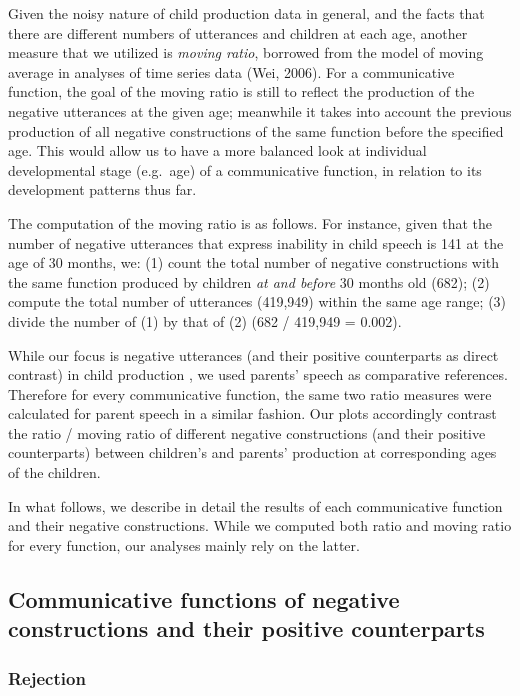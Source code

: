 \documentclass[
  english,
  man,floatsintext]{apa6}
\begin{document}
Given the noisy nature of child production data in general, and the facts that there are different numbers of utterances and children at each age, another measure that we utilized is \emph{moving ratio}, borrowed from the model of moving average in analyses of time series data (Wei, 2006). For a communicative function, the goal of the moving ratio is still to reflect the production of the negative utterances at the given age; meanwhile it takes into account the previous production of all negative constructions of the same function before the specified age. This would allow us to have a more balanced look at individual developmental stage (e.g.~age) of a communicative function, in relation to its development patterns thus far.

The computation of the moving ratio is as follows. For instance, given that the number of negative utterances that express inability in child speech is 141 at the age of 30 months, we: (1) count the total number of negative constructions with the same function produced by children \emph{at and before} 30 months old (682); (2) compute the total number of utterances (419,949) within the same age range; (3) divide the number of (1) by that of (2) (682 / 419,949 = 0.002).

While our focus is negative utterances (and their positive counterparts as direct contrast) in child production , we used parents' speech as comparative references. Therefore for every communicative function, the same two ratio measures were calculated for parent speech in a similar fashion. Our plots accordingly contrast the ratio / moving ratio of different negative constructions (and their positive counterparts) between children's and parents' production at corresponding ages of the children.

In what follows, we describe in detail the results of each communicative function and their negative constructions. While we computed both ratio and moving ratio for every function, our analyses mainly rely on the latter.

\hypertarget{communicative-functions-of-negative-constructions-and-their-positive-counterparts}{%
\subsection{Communicative functions of negative constructions and their positive counterparts}\label{communicative-functions-of-negative-constructions-and-their-positive-counterparts}}

\hypertarget{rejection}{%
\subsubsection{Rejection}\label{rejection}}
\end{document}
